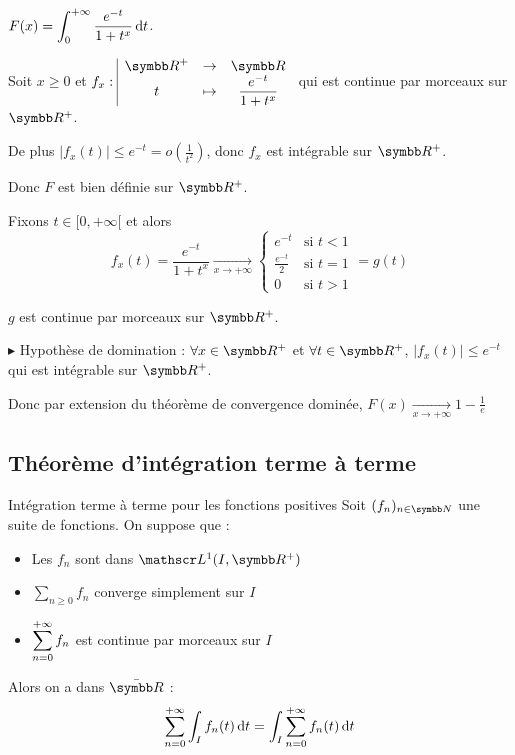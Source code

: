 \begin{exemple}
    $\displaystyle F(x) = \int_0^{+ \infty} \frac{e^{-t}}{1 + t^x} \,\mathrm{d}t$.

    Soit $x \geqslant 0$ et $\fonction {f_x}{\R^+}{\R}{t}{\frac{e^{-t}}{1 + t^x}}$ qui est continue par morceaux sur $\R^+$.

    De plus $|f_x(t)| \leqslant e^{-t} = o\left( \frac 1 {t^2} \right)$, donc $f_x$ est intégrable sur $\R^+$.

    Donc $F$ est bien définie sur $\R^+$.

    Fixons $t \in [0, + \infty[ $ et alors 
    $$f_x(t) = \frac{e^{-t}}{1 + t^x} \xrightarrow[x \to + \infty]{} \begin{cases}
        e^{-t} & \text{si } t < 1 \\
        \frac{e^{-t}}{2} & \text{si } t = 1 \\
        0 & \text{si } t > 1
    \end{cases} = g(t)$$

    $g$ est continue par morceaux sur $\R^+$. 

    $\blacktriangleright$ Hypothèse de domination : $\forall x \in \R^+$ et $\forall t \in \R^+$, $|f_x(t)| \leqslant e^{-t}$ qui est intégrable sur $\R^+$.

    Donc par extension du théorème de convergence dominée, $F(x) \xrightarrow[x \to + \infty]{} 1 - \frac 1 e$
\end{exemple}

\subsection{Théorème d'intégration terme à terme}

\begin{theoreme}{Intégration terme à terme pour les fonctions positives}{}
    Soit $(f_n)_{n \in \N}$ une suite de fonctions. On suppose que : 
    \begin{itemize}
        \item Les $f_n$ sont dans $\mathscr L^1(I, \R^+)$
        \item $\sum_{n \geqslant 0} f_n$ converge simplement sur $I$
        \item $\displaystyle \sum_{n = 0}^{+ \infty} f_n$ est continue par morceaux sur $I$
    \end{itemize}
    Alors on a dans $\bar{\R}$ : 
    $$\sum_{n = 0}^{+ \infty} \int_I f_n(t) \,\mathrm{d}t = \int_I \sum_{n = 0}^{+ \infty} f_n(t) \,\mathrm{d}t$$
\end{theoreme}


